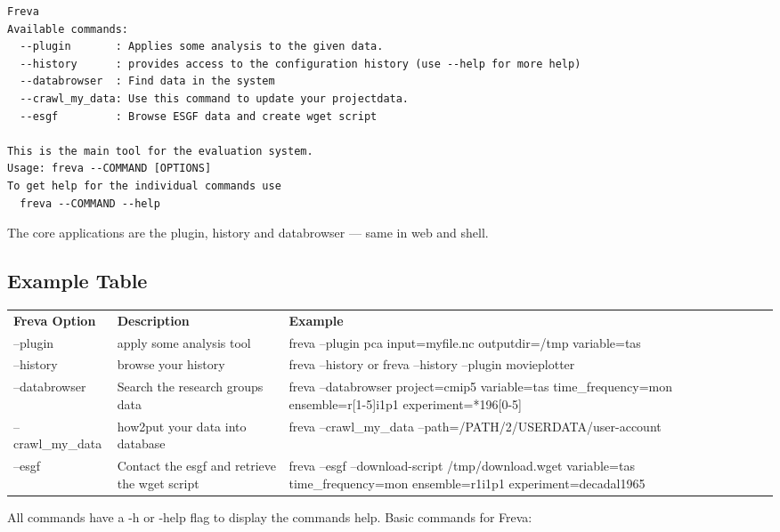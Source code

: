 \documentclass[a4paper,11pt]{ltxdoc}
\begin{document}
\begin{verbatim} 
Freva
Available commands:
  --plugin       : Applies some analysis to the given data.
  --history      : provides access to the configuration history (use --help for more help)
  --databrowser  : Find data in the system
  --crawl_my_data: Use this command to update your projectdata.
  --esgf         : Browse ESGF data and create wget script

This is the main tool for the evaluation system.
Usage: freva --COMMAND [OPTIONS]
To get help for the individual commands use
  freva --COMMAND --help
\end{verbatim}

The core applications are the plugin, history and databrowser --- same in web and shell.

\subsection*{Example Table}
\begin{tabular}{lllll}
\cline{1-1}
\multicolumn{1}{|l|}{\textbf{Freva Option} }  & \multicolumn{1}{|l|}{\textbf{Description}}  & \multicolumn{1}{|l|}{\textbf{Example} }   \\
--plugin & apply some analysis tool &  freva --plugin pca input=myfile.nc outputdir=/tmp variable=tas  \\
--history & browse your history & freva --history or freva --history --plugin movieplotter \\
--databrowser & Search the research groups data  &  freva --databrowser project=cmip5 variable=tas time\_frequency=mon ensemble=r[1-5]i1p1 experiment=*196[0-5] \\
--crawl\_my\_data & how2put your data into database & freva --crawl\_my\_data --path=/PATH/2/USERDATA/user-account \\
 --esgf & Contact the esgf and retrieve the wget script & freva --esgf --download-script /tmp/download.wget variable=tas time\_frequency=mon ensemble=r1i1p1 experiment=decadal1965
 
\end{tabular}

All commands have a -h or -\-help flag to display the commands help.
Basic commands for Freva: 
\end{document}
